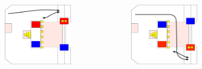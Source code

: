 \documentclass{beamer}
\begin{document}
\begin{frame}
\begin{columns}
\begin{figure}
  \end{figure}
  \begin{figure}
   \includegraphics[scale=0.15]{assets/paths/10_LL}
  \end{figure}
  \begin{figure}
   \includegraphics[scale=0.15]{assets/paths/10_RR}
  \end{figure}
 \end{columns}
\end{frame}
\end{document}
